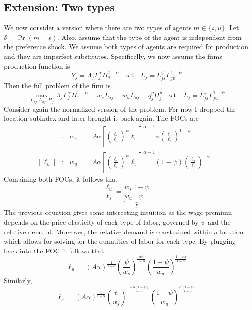 \documentclass[12pt]{article}
\begin{document}
\subsection{Extension: Two types}
We now consider a version where there are two types of agents $m\in\{s,u\}$. Let $\delta=\Pr\left(m=s\right)$. Also, assume that the type of the agent is independent from the preference shock. We assume both types of agents are required for production and they are imperfect substitutes. Specifically, we now assume the firms production function is 
\begin{equation*}
    Y_j = A_j L_j^\alpha H_j^{1-\alpha}\quad\text{s.t}\quad L_j = L_{js}^\psi L_{ju}^{1-\psi}
\end{equation*}
Then the full problem of the firm is 
\begin{equation*}
    \max_{L_{sj},L_{uj},H_j}  A_j L_j^\alpha H_j^{1-\alpha}-w_sL_{sj}-w_uL_{uj}-q_j^pH_j^p\quad\text{s.t}\quad L_j = L_{js}^\psi L_{ju}^{1-\psi}
\end{equation*}
Consider again the normalized version of the problem. For now I dropped the location subindex and later brought it back again. The FOCs are 
\begin{align*}
    [\ell_s]&: & w_s&= A\alpha\left[\left(\frac{\ell_s}{\ell_u}\right)^{\psi}\ell_u\right]^{\alpha-1}\psi \left(\frac{\ell_u}{\ell_s}\right)^{1-\psi}  & \\ 
    [\ell_u]&: & w_u&= A\alpha\left[\left(\frac{\ell_s}{\ell_u}\right)^{\psi}\ell_u\right]^{\alpha-1}(1-\psi) \left(\frac{\ell_u}{\ell_s}\right)^{-\psi} &
\end{align*}
Combining both FOCs, it follows that
\begin{equation*}
    \frac{\ell_u}{\ell_s} = \underbrace{\frac{w_s}{w_u}\frac{1-\psi}{\psi}}_{\Gamma}
\end{equation*}
The previous equation gives some interesting intuition as the wage premium depends on the price elasticity of each type of labor, governed by $\psi$ and the relative demand. Moreover, the relative demand is constrained within a location which allows for solving for the quantities of labor for each type. By plugging back into the FOC it follows that 
\begin{equation*}
    \ell_u = \left(A\alpha\right)^{\frac{1}{1-\alpha}}\left(\frac{\psi}{w_s}\right)^{\frac{\alpha\psi}{1-\alpha}} \left(\frac{1-\psi}{w_u}\right)^{\frac{1-\psi\alpha}{1-\alpha}}
\end{equation*}
Similarly, 
\begin{equation*}
    \ell_s = \left(A\alpha\right)^{\frac{1}{1-\alpha}}\left(\frac{\psi}{w_s}\right)^{\frac{1-\alpha(1-\psi)}{1-\alpha}} \left(\frac{1-\psi}{w_u}\right)^{\frac{\alpha(1-\psi)}{1-\alpha}}
\end{equation*}
\end{document}

